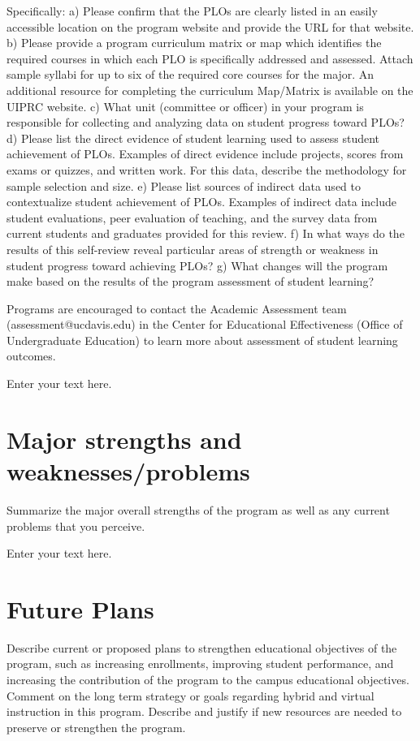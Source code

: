 \documentclass[12pt]{article}
\begin{document}
Specifically:
    a) Please confirm that the PLOs are clearly listed in an easily accessible location on the program website and provide the URL for that website.
    b) Please provide a program curriculum matrix or map which identifies the required courses in which each PLO is specifically addressed and assessed. Attach sample syllabi for up to six of the required core courses for the major. An additional resource for completing the curriculum Map/Matrix is available on the UIPRC website.
    c) What unit (committee or officer) in your program is responsible for collecting and analyzing data on student progress toward PLOs?
    d) Please list the direct evidence of student learning used to assess student achievement of PLOs. Examples of direct evidence include projects, scores from exams or quizzes, and written work. For this data, describe the methodology for sample selection and size.  
    e) Please list sources of indirect data used to contextualize student achievement of PLOs. Examples of indirect data include student evaluations, peer evaluation of teaching, and the survey data from current students and graduates provided for this review.
    f) In what ways do the results of this self-review reveal particular areas of strength or weakness in student progress toward achieving PLOs?
    g) What changes will the program make based on the results of the program assessment of student learning?

Programs are encouraged to contact the Academic Assessment team (assessment@ucdavis.edu) in the Center for Educational Effectiveness (Office of Undergraduate Education) to learn more about assessment of student learning outcomes.

Enter your text here.










 

\section{Major strengths and weaknesses/problems}
Summarize the major overall strengths of the program as well as any current problems that you perceive. 

Enter your text here.

\section{Future Plans}
Describe current or proposed plans to strengthen educational objectives of the program, such as increasing enrollments, improving student performance, and increasing the contribution of the program to the campus educational objectives. Comment on the long term strategy or goals regarding hybrid and virtual instruction in this program. Describe and justify if new resources are needed to preserve or strengthen the program.
\end{document}
